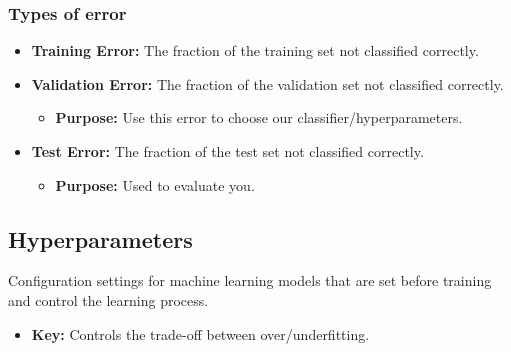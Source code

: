     \subsubsection{Types of error}
    \begin{definition}
        \begin{itemize}
            \item \textbf{Training Error:} The fraction of the training set not classified correctly.
            
            \item \textbf{Validation Error:} The fraction of the validation set not classified correctly.
            \begin{itemize}
                \item \textbf{Purpose:} Use this error to choose our classifier/hyperparameters.
            \end{itemize}
            
            \item \textbf{Test Error:} The fraction of the test set not classified correctly.
            \begin{itemize}
                \item \textbf{Purpose:} Used to evaluate you.
            \end{itemize}
        \end{itemize}
    \end{definition}

\subsection{Hyperparameters}
\begin{definition}
    Configuration settings for machine learning models that are set before training and control the learning process.
    \begin{itemize}
        \item \textbf{Key:} Controls the trade-off between over/underfitting. 
    \end{itemize}
\end{definition}

